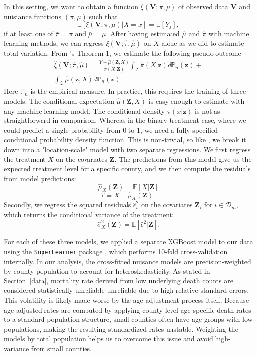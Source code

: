 \documentclass{article}
\theoremstyle{plain}
\theoremstyle{definition}
\theoremstyle{remark}
\begin{document}
In this setting, we want to obtain a function $\xi(\mathbf V;\pi,\mu)$ of observed data $\mathbf V$ and nuisiance functions
$(\pi, \mu)$
such that
$$\mathbb E[\xi(\mathbf V;\bar\pi,\bar\mu)|X=x]=\mathbb E[Y_x],$$
if at least one of $\bar \pi = \pi$ and $\bar \mu  = \mu$.
After having estimated $\hat \mu$ and $\hat \pi$ with machine learning methods, we can regress $\xi(\mathbf V;\hat\pi,\hat\mu)$ on
$X$ alone as we did to estimate total variation.
From \citet{kennedy2017non}'s Theorem 1,
we estimate the following pseudo-outcome
\begin{multline}
\label{eq:pseudo}
    \hat \xi(\mathbf V; \hat \pi, \hat \mu)=\frac{Y-\hat \mu(\mathbf Z, X)}{\hat \pi (X|\mathbf Z)}\int_\mathcal Z \hat\pi(X|\mathbf z)d \mathbb P_n(\mathbf z)+\\
    \int_\mathcal Z \hat \mu(\mathbf z, X)d \mathbb P_n(\mathbf z)
\end{multline}
Here $\mathbb P_n$ is the empirical measure.
In practice, this requires the training of three models. The conditional expectation $\hat \mu(\mathbf Z, X)$ is easy enough to estimate with
any machine learning model. The conditional density $\pi(x|\mathbf z)$ is not as
straightforward in comparison. Whereas in the binary treatment case, where we could predict a single probability from 0 to 1, we need a fully specified
conditional probability density function. This is
non-trivial, so like \citet{kennedy2017non}, we break it down into a "location-scale" model with two separate regressions.
We first regress the treatment $X$ on the covariates $\mathbf Z$. The predictions from this model give
us the expected treatment level for a specific county,
and we then compute the residuals from model predictions:
$$\hat \mu_X(\mathbf Z) = \mathbb E[X|\mathbf Z]$$
$$\hat \epsilon=X-\hat \mu_X(\mathbf Z).$$
Secondly, we regress the squared residuals $\hat \epsilon^2_i$ on the covariates $\mathbf Z_i$ for $i \in \mathcal D_m$, which
returns the conditional variance of the treatment:
$$\hat \sigma^2_X(\mathbf Z) = \mathbb E[\hat \epsilon^2|\mathbf Z].$$



For each of these three models, we applied a separate XGBoost model to our data
using the \texttt{SuperLearner} package \citep{SuperLearner}, which performs 10-fold cross-validation internally. In our analysis, the cross-fitted nuisance models are precision-weighted by county population to account for heteroskedasticity. As stated in Section~\ref{data}, mortality rate
derived from low underlying death counts are considered
statistically unreliable unreliable due to high 
relative standard errors. This volatility is likely made
worse by the age-adjustment process itself. Because
age-adjusted rates are computed by applying county-level age-specific death rates to a standard population structure, small counties often have age groups with
low populations, making the resulting standardized rates
unstable. Weighting the models by total population helps us to overcome this issue and avoid high-variance from
small counties.
\end{document}
